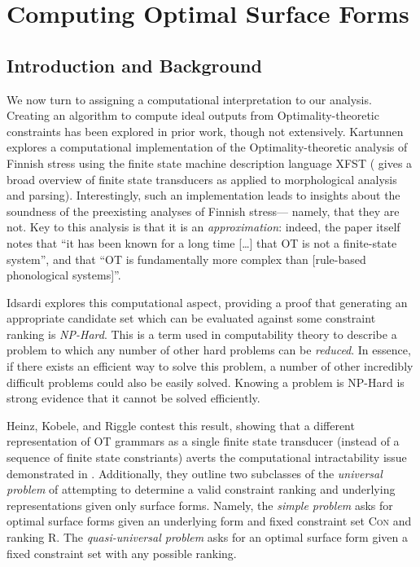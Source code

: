 \documentclass[12pt]{article}
\begin{document}
\pagebreak

\section{Computing Optimal Surface Forms}

\subsection{Introduction and Background}

We now turn to assigning a computational interpretation to our analysis.
Creating an algorithm to compute ideal outputs from Optimality-theoretic
constraints has been explored in prior work, though not extensively. Kartunnen
\cite{karttunen2006finite} explores a computational implementation of the
Optimality-theoretic analysis of Finnish stress using the finite state machine
description language XFST (\cite{karttunen2001applications} gives a broad
overview of finite state transducers as applied to morphological analysis and
parsing). Interestingly, such an implementation leads to insights about the
soundness of the preexisting analyses of Finnish stress--- namely, that they
are not. Key to this analysis is that it is an \textit{approximation}: indeed,
the paper itself notes that ``it has been known for a long time [\ldots] that
\textsc{OT} is not a finite-state system'', and that ``\textsc{OT} is
fundamentally more complex than [rule-based phonological systems]''.

Idsardi \cite{idsardi2006simple} explores this computational aspect, providing
a proof that generating an appropriate candidate set which can be evaluated
against some constraint ranking is \textit{NP-Hard}. This is a term used in
computability theory to describe a problem to which any number of other hard
problems can be \textit{reduced}. In essence, if there exists an efficient way
to solve this problem, a number of other incredibly difficult problems could
also be easily solved. Knowing a problem is NP-Hard is strong evidence that it
cannot be solved efficiently.

Heinz, Kobele, and Riggle \cite{heinz2009evaluating} contest this result,
showing that a different representation of \textsc{OT} grammars as a single
finite state transducer (instead of a sequence of finite state constriants)
averts the computational intractability issue demonstrated in
\cite{idsardi2006simple}. Additionally, they outline two subclasses of the
\textit{universal problem} of attempting to determine a valid constraint
ranking and underlying representations given only surface forms. Namely,
the \textit{simple problem} asks for optimal surface forms given an underlying
form and fixed constraint set \textsc{Con} and ranking \textsc{R}. The
\textit{quasi-universal problem} asks for an optimal surface form given
a fixed constraint set with any possible ranking.
\end{document}
